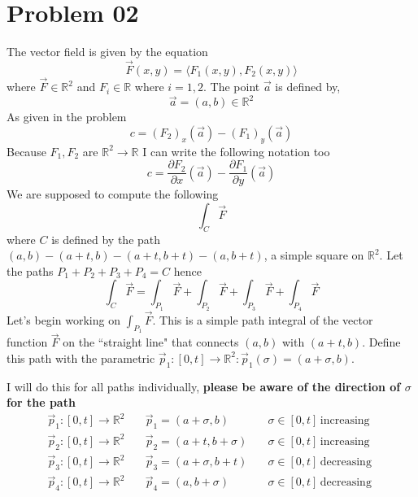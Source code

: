 \documentclass[letter]{article}
\begin{document}
\newpage
\section*{Problem 02} 


The vector field is given by the equation 
\[
\vec{F}(x,y) = \langle F_1 (x,y), F_2(x,y)\rangle
\] where $\vec{F} \in \mathbb{R}^{2}$ and $F_i \in \mathbb{R}$ where $ i = 1, 2 $. 
The point $\vec{a}$ is defined by,
\[
\vec{a} = (a,b) \in \mathbb{R}^{2}
\]
As given in the problem
\[
c = (F_2)_x (\vec{a}) - (F_1)_y (\vec{a}) \] Because $F_1, F_2$ are $\mathbb{R}^{2}\to \mathbb{R}$ I can write the following notation too \[ c=  \frac{\partial F_2}{\partial x} (\vec{a}) - \frac{\partial F_1}{\partial y} (\vec{a})
\]
We are supposed to compute the following
\[
\int_C \vec{F}
\]
where $C$ is defined by the path $(a,b) - (a+t, b) - (a+t,b+t) - (a, b+t)$, a simple square on $\mathbb{R}^{2}$. Let the paths $P_1+P_2+P_3+P_4 = C$ hence 
\[
	\int_C \vec{F} = \int_{P_1} \vec{F} + 
	\int_{P_2} \vec{F} + 
	\int_{P_3} \vec{F} + 
	\int_{P_4} \vec{F}
\]
Let's begin working on $\int_{P_1} \vec{F}$. This is a simple path integral of the vector function $\vec{F}$ on the ``straight line" that connects $(a,b) $ with $(a+t,b)$. Define this path with the parametric $\vec{p}_1: [0,t] \to \mathbb{R}^2: \vec{p}_1(\sigma) = (a+\sigma,b) $. 

I will do this for all paths individually, \textbf{please be aware of the direction of $\sigma$ for the path}
\begin{align*}
	\vec{p}_1 : [0,t] \to  \mathbb{R}^2 & \quad \vec{p}_1 = (a+\sigma,b) \quad &\sigma \in [0,t] \, \text{increasing}\\  
	\vec{p}_2 : [0,t] \to  \mathbb{R} ^2& \quad \vec{p}_2 = (a+t,b+\sigma) \quad &\sigma \in [0,t] \, \text{increasing}\\  
	\vec{p}_3 : [0,t] \to  \mathbb{R} ^2& \quad \vec{p}_3 = (a + \sigma ,b+t) \quad &\sigma \in [0,t] \, \text{decreasing} \\  
	\vec{p}_4 : [0,t] \to  \mathbb{R} ^2& \quad \vec{p}_4 = (a,b + \sigma) \quad &\sigma \in [0,t] \, \text{decreasing }\\  
\end{align*}
\end{document}
